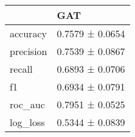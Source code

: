 \begin{tabular}{ll}
\toprule
 & GAT \\
\midrule
accuracy & 0.7579 ± 0.0654 \\
precision & 0.7539 ± 0.0867 \\
recall & 0.6893 ± 0.0706 \\
f1 & 0.6934 ± 0.0791 \\
roc_auc & 0.7951 ± 0.0525 \\
log_loss & 0.5344 ± 0.0839 \\
\bottomrule
\end{tabular}
